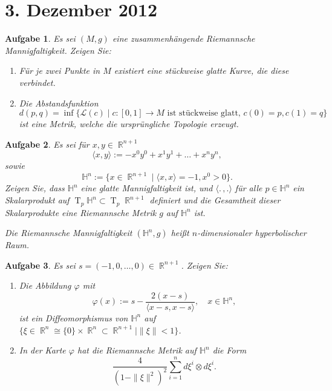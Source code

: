 \documentclass[paper=A4, twoside, chapterprefix=true, bibliography=totoc, headsepline]{scrbook}
\let\temp\phi{}
\let\phi\varphi{}
\let\varphi\temp{}
\let\temp\theta{}
\let\theta\vartheta{}
\let\vartheta\temp{}
\let\temp\epsilon{}
\let\epsilon\varepsilon{}
\let\varepsilon\temp{}
\let\temp\rho{}
\let\rho\varrho{}
\let\varrho\temp{}
\DeclareMathOperator{\R}{\mathbb{R}}
\DeclareMathOperator{\T}{T}         %
\newcommand{\tensor}{\otimes}
\theoremstyle{plain}
\theoremstyle{nonumberplain}
\theoremstyle{empty}
\theoremstyle{break}
\newtheorem{Aufg}{Aufgabe}
\begin{document}

\section{3. Dezember 2012}
\setcounter{Aufg}{0} %
\setcounter{Loes}{0}

\begin{Aufg}
Es sei $(M,g)$ eine zusammenhängende Riemannsche Mannigfaltigkeit. Zeigen Sie:
\begin{enumerate}[label=\alph*),leftmargin=*,widest=b]
\item
	Für je zwei Punkte in $M$ existiert eine stückweise glatte Kurve, die diese verbindet.
\item
	Die Abstandsfunktion 
		\[d(p,q)=\inf\{\mathcal{L}(c) \mid c:[0,1] \to M \text{ ist stückweise glatt, } c(0)=p, c(1)=q\}\]
	ist eine Metrik, welche die ursprüngliche Topologie erzeugt.
\end{enumerate}\end{Aufg}

\begin{Aufg}
Es sei für $x,y\in \R^{n+1}$ 
	\[\langle x,y \rangle:= - x^0 y^0 + x^1 y^1 +\dots + x^n y^n,\]
sowie 
	\[\mathbb{H}^n:= \{x\in \R^{n+1} \mid \langle x,x \rangle =-1, x^0 > 0\}.\]
Zeigen Sie, dass $\mathbb{H}^n$ eine glatte Mannigfaltigkeit ist, und $\langle. \,, . \rangle$ für alle $p\in \mathbb{H}^n$ ein Skalarprodukt auf $\T_p \mathbb{H}^n \subset \T_p \R^{n+1}$   definiert und die Gesamtheit dieser Skalarprodukte eine Riemannsche Metrik $g$ auf $\mathbb{H}^n$ ist.

Die Riemannsche Mannigfaltigkeit $(\mathbb{H}^n, g)$ heißt \emph{$n$-dimensionaler hyperbolischer Raum}.
\end{Aufg}

\begin{Aufg}
Es sei $s=(-1,0,\dots,0) \in \R^{n+1}$. Zeigen Sie:
\begin{enumerate}[label=\alph*),leftmargin=*,widest=b]
\item
	Die Abbildung $\phi$ mit 
		\[\phi(x):=s-\frac{2 (x-s)}{\langle x-s,x-s\rangle}, \quad x\in \mathbb{H}^n, \]
	ist ein Diffeomorphismus von $\mathbb{H}^n$ auf $\{\xi \in \R^n \cong \{0\} \times \R^n\subset \R^{n+1} \mid \| \xi\|<1\}$.
\item
	In der Karte $\phi$ hat die Riemannsche Metrik auf $\mathbb{H}^n$ die Form \[ \frac{4}{(1-\|\xi \|^2)^2} \sum_{i=1}^nd\xi^i \tensor d\xi^i.\] 
\end{enumerate}\end{Aufg}
\end{document}
